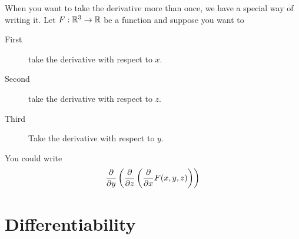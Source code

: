 \documentclass{ximera}
\begin{document}
When you want to take the derivative more than once, we have a special
way of writing it. Let $F:\mathbb R^3\to\mathbb R$ be a function and suppose you want to
\begin{description}
\item[First] take the derivative with respect to $x$.
\item[Second] take the derivative with respect to $z$.
\item[Third] Take the derivative with respect to $y$.
\end{description}
You could write
\[
\frac{\partial }{\partial y} \left(\frac{\partial }{\partial z}\left(\frac{\partial }{\partial x} F(x,y,z)\right)\right)
\]


\section{Differentiability}
\end{document}
